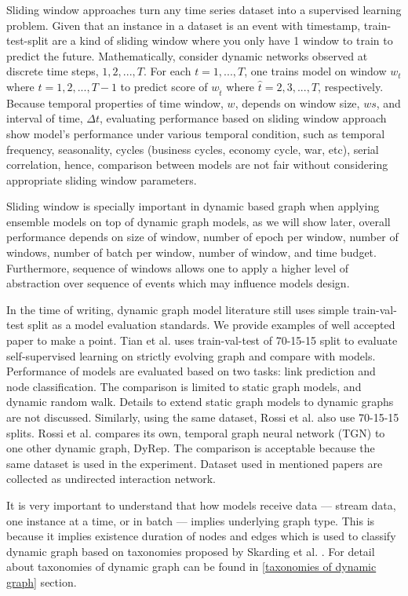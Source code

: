 \documentclass{IEEEtran}
\begin{document}
Sliding window approaches turn any time series dataset into a supervised learning problem. Given that an instance in a dataset is an event with timestamp, train-test-split are a kind of sliding window where you only have 1 window to train to predict the future. Mathematically, consider dynamic networks observed at discrete time steps, \(1,2,...,T\). For each \(t = 1,...,T\), one trains model on window \(w_{t}\) where \(t=1,2,...,T-1\) to predict score of \(w_{\hat t}\) where \(\hat t=2,3,...,T\), respectively. Because temporal properties of time window, \(w\), depends on window size, \(ws\), and interval of time, \(\Delta t\), evaluating performance based on sliding window approach show model's performance under various temporal condition, such as temporal frequency, seasonality, cycles (business cycles, economy cycle, war, etc), serial correlation, hence, comparison between models are not fair without considering appropriate sliding window parameters.

Sliding window is specially important in dynamic based graph when applying ensemble models on top of dynamic graph models, as we will show later, overall performance depends on size of window, number of epoch per window, number of windows, number of batch per window, number of window, and time budget. Furthermore, sequence of windows allows one to apply a higher level of abstraction over sequence of events which may influence models design.

In the time of writing, dynamic graph model literature still uses simple train-val-test split as a model evaluation standards. We provide examples of well accepted paper to make a point. Tian et al. \cite{tian2021self} uses train-val-test of 70-15-15 split to evaluate self-supervised learning on strictly evolving graph and compare with models. Performance of models are evaluated based on two tasks: link prediction and node classification. The comparison is limited to static graph models, and dynamic random walk. Details to extend static graph models to dynamic graphs are not discussed. Similarly, using the same dataset, Rossi et al. \cite{rossi2020temporal} also use 70-15-15 splits. Rossi et al. compares its own, temporal graph neural network (TGN) to one other dynamic graph, DyRep. The comparison is acceptable because the same dataset is used in the experiment. Dataset used in mentioned papers are collected as undirected interaction network.

It is very important to understand that how models receive data --- stream data, one instance at a time, or in batch --- implies underlying graph type. This is because it implies existence duration of nodes and edges which is used to classify dynamic graph based on taxonomies proposed by Skarding et al. \cite{skardingFoundationsModelingDynamic2021}. For detail about taxonomies of dynamic graph can be found in \ref{taxonomies of dynamic graph} section.
\end{document}
